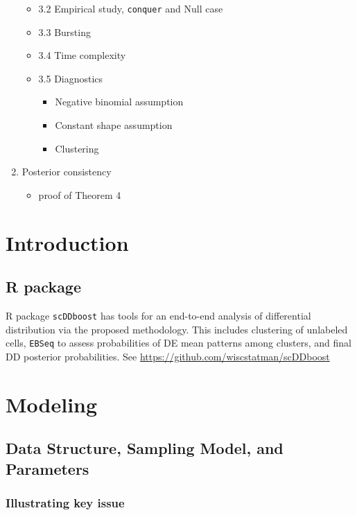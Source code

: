 \documentclass[aoas,preprint]{imsart}
\begin{document}
\begin{enumerate}
\begin{itemize}
   \item 3.2 Empirical study, \verb+conquer+ and Null case
   \item 3.3 Bursting
   \item 3.4 Time complexity
   \item {3.5 Diagnostics}
    \begin{itemize}
    \item {Negative binomial assumption}
    \item {Constant shape assumption}
    \item {Clustering}
    \end{itemize}
   \end{itemize}
\item Posterior consistency
  \begin{itemize}
   \item proof of Theorem 4
  \end{itemize}
\end{enumerate}


\clearpage

\section{Introduction}


\subsection{R package}

 R package \texttt{scDDboost} has tools for an end-to-end analysis of differential distribution
via the proposed methodology. This includes clustering of unlabeled cells, \verb+EBSeq+ to assess
 probabilities of DE mean patterns among clusters,  and final DD posterior probabilities. 
See \url {https://github.com/wiscstatman/scDDboost}



\section{Modeling}

\subsection{Data Structure, Sampling Model, and Parameters}

\subsubsection*{{\bf Illustrating key issue}}
\end{document}
